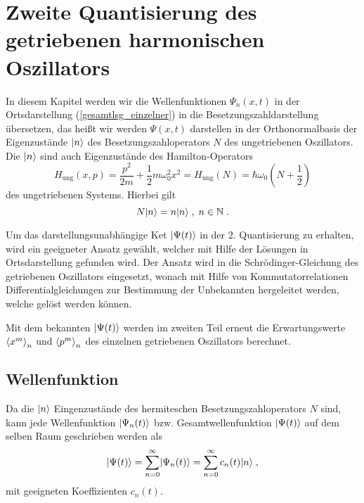 \chapter{Zweite Quantisierung des getriebenen harmonischen Oszillators}
\label{5}
In diesem Kapitel werden wir die Wellenfunktionen $\Psi_n(x,t)$ in der Ortsdarstellung (\ref{gesamtlsg_einzelner}) in die Besetzungszahldarstellung übersetzen, das heißt wir werden $\Psi(x,t)$ darstellen in der Orthonormalbasis der Eigenzustände $\lvert n\rangle$ des Besetzungszahloperators $N$ des ungetriebenen Oszillators.
Die $\lvert n\rangle$ sind auch Eigenzustände des Hamilton-Operators
\begin{equation}
   H_\text{ung}(x,p) = \frac{ p^2}{2m} + \frac 1 2 m\omega_0^2 x^2 = H_{\text{ung}}(N)= \hbar\omega_0\left(N+\frac 1 2\right)
\end{equation}
des ungetriebenen Systems.
Hierbei gilt
\begin{equation}
   N \lvert n\rangle = n \lvert n\rangle \;,\; n\in \mathbb{N} \;.
\end{equation}
\iffalse
\begin{equation}
  H=\frac{\hat p^2}{2m} + \frac 1 2 m\omega_0^2\hat x^2 = \hbar\eft(\hat n+\frac 1 2\right)
\end{equation}
\fi
Um das darstellungsunabhängige Ket $\lvert\Psi(t)\rangle$ in der 2. Quantisierung zu erhalten, wird ein geeigneter Ansatz gewählt, welcher mit Hilfe der Lösungen in Ortsdarstellung gefunden wird.
Der Ansatz wird in die Schrödinger-Gleichung des getriebenen Oszillators eingesetzt, wonach mit Hilfe von Kommutatorrelationen Differentialgleichungen zur Bestimmung der Unbekannten hergeleitet werden, welche gelöst werden können.

Mit dem bekannten $\lvert\Psi(t)\rangle$ werden im zweiten Teil erneut die Erwartungswerte $\braket{x^m}_n$ und $\braket{p^m}_n$ des einzelnen getriebenen Oszillators berechnet.


\section{Wellenfunktion}
  Da die $\lvert n\rangle$ Eingenzustände des hermiteschen Besetzungszahloperators $N$ sind, kann jede Wellenfunktion $\lvert\Psi_n(t)\rangle$ bzw. Gesamtwellenfunktion $\lvert\Psi(t)\rangle$ auf dem selben Raum geschrieben werden als
  \begin{equation}
    \lvert\Psi(t)\rangle=\sum_{n=0}^{\infty}\lvert\Psi_n(t)\rangle=\sum_{n=0}^{\infty}c_n(t)\lvert n\rangle \;,
  \end{equation}
  mit geeigneten Koeffizienten $c_n(t)$.

